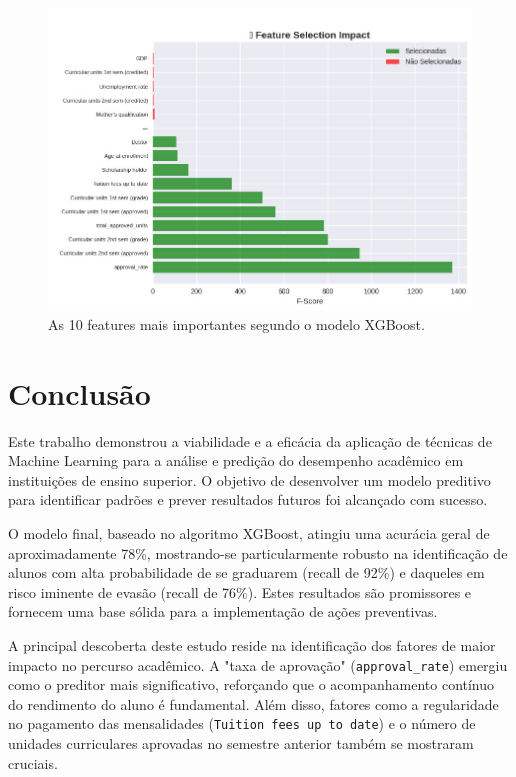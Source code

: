 \documentclass[12pt]{article}
\begin{document}
\begin{figure}[h!]
\centering
\includegraphics[width=1.0\textwidth]{images/feature_importance.jpg}
\caption{As 10 features mais importantes segundo o modelo XGBoost.}
\label{fig:feature_importance}
\end{figure}


\section{Conclusão}
Este trabalho demonstrou a viabilidade e a eficácia da aplicação de técnicas de Machine Learning para a análise e predição do desempenho acadêmico em instituições de ensino superior. O objetivo de desenvolver um modelo preditivo para identificar padrões e prever resultados futuros foi alcançado com sucesso.

O modelo final, baseado no algoritmo XGBoost, atingiu uma acurácia geral de aproximadamente 78\%, mostrando-se particularmente robusto na identificação de alunos com alta probabilidade de se graduarem (recall de 92\%) e daqueles em risco iminente de evasão (recall de 76\%). Estes resultados são promissores e fornecem uma base sólida para a implementação de ações preventivas.

A principal descoberta deste estudo reside na identificação dos fatores de maior impacto no percurso acadêmico. A "taxa de aprovação" (\texttt{approval\_rate}) emergiu como o preditor mais significativo, reforçando que o acompanhamento contínuo do rendimento do aluno é fundamental. Além disso, fatores como a regularidade no pagamento das mensalidades (\texttt{Tuition fees up to date}) e o número de unidades curriculares aprovadas no semestre anterior também se mostraram cruciais.
\end{document}
